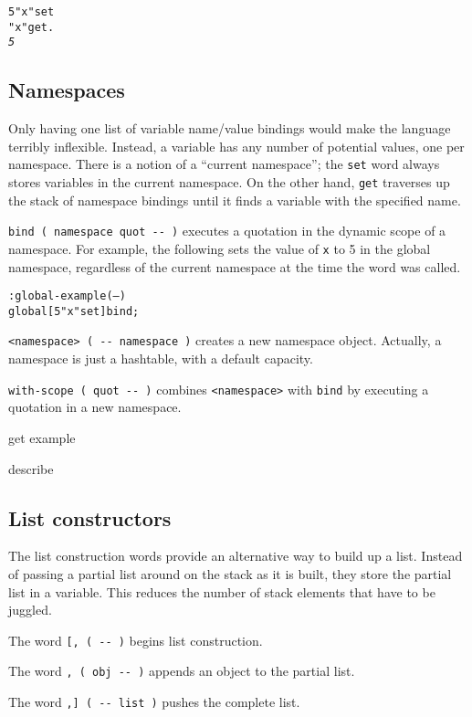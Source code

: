 \documentclass[english]{article}
\begin{document}
\begin{alltt}
5 "x" set
"x" get .
\emph{5}
\end{alltt}

\subsection{Namespaces}

Only having one list of variable name/value bindings would make the language terribly inflexible. Instead, a variable has any number of potential values, one per namespace. There is a notion of a ``current namespace''; the \texttt{set} word always stores variables in the current namespace. On the other hand, \texttt{get} traverses up the stack of namespace bindings until it finds a variable with the specified name.

\texttt{bind ( namespace quot -{}- )} executes a quotation in the dynamic scope of a namespace. For example, the following sets the value of \texttt{x} to 5 in the global namespace, regardless of the current namespace at the time the word was called.

\begin{alltt}
: global-example ( -- )
    global {[} 5 "x" set {]} bind ;
\end{alltt}

\texttt{<namespace> ( -{}- namespace )} creates a new namespace object. Actually, a namespace is just a hashtable, with a default capacity.

\texttt{with-scope ( quot -{}- )} combines \texttt{<namespace>} with \texttt{bind} by executing a quotation in a new namespace.

get example

describe

\subsection{\label{sub:List-constructors}List constructors}

The list construction words provide an alternative way to build up a list. Instead of passing a partial list around on the stack as it is built, they store the partial list in a variable. This reduces the number
of stack elements that have to be juggled.

The word \texttt{{[}, ( -{}- )} begins list construction.

The word \texttt{, ( obj -{}- )} appends an object to the partial
list.

The word \texttt{,{]} ( -{}- list )} pushes the complete list.
\end{document}
